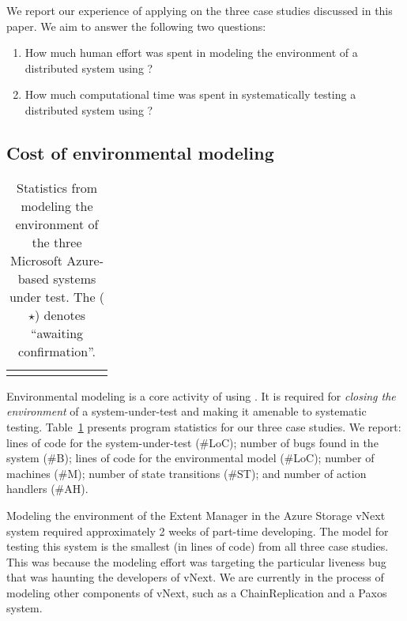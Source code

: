 We report our experience of applying \psharp on the three case studies discussed in this paper. We aim to answer the following two questions:

\begin{enumerate}
\item How much human effort was spent in modeling the environment of a distributed system using \psharp?

\item How much computational time was spent in systematically testing a distributed system using \psharp?
\end{enumerate}

\subsection{Cost of environmental modeling}
\label{sec:eval:human_cost}

\newcommand{\colspacing}{\hspace{1.8em}}
\begin{table}[t]
\small
\centering
\setlength{\tabcolsep}{0.3em}
\begin{tabular}{l rrrrr rr}
\centering

\end{tabular}
\caption{Statistics from modeling the environment of the three Microsoft Azure-based systems under test. The ($\star$) denotes ``awaiting confirmation''.}
\label{tab:stats}
\end{table}

Environmental modeling is a core activity of using \psharp. It is required for \emph{closing the environment} of a system-under-test and making it amenable to systematic testing. Table~\ref{tab:stats} presents program statistics for our three case studies. We report: lines of code for the system-under-test (\#LoC); number of bugs found in the system (\#B); lines of \psharp code for the environmental model (\#LoC); number of machines (\#M); number of state transitions (\#ST); and number of action handlers (\#AH).

Modeling the environment of the Extent Manager in the Azure Storage vNext system required approximately 2 weeks of part-time developing. The \psharp model for testing this system is the smallest (in lines of code) from all three case studies. This was because the modeling effort was targeting the particular liveness bug that was haunting the developers of vNext. We are currently in the process of modeling other components of vNext, such as a ChainReplication and a Paxos system.

